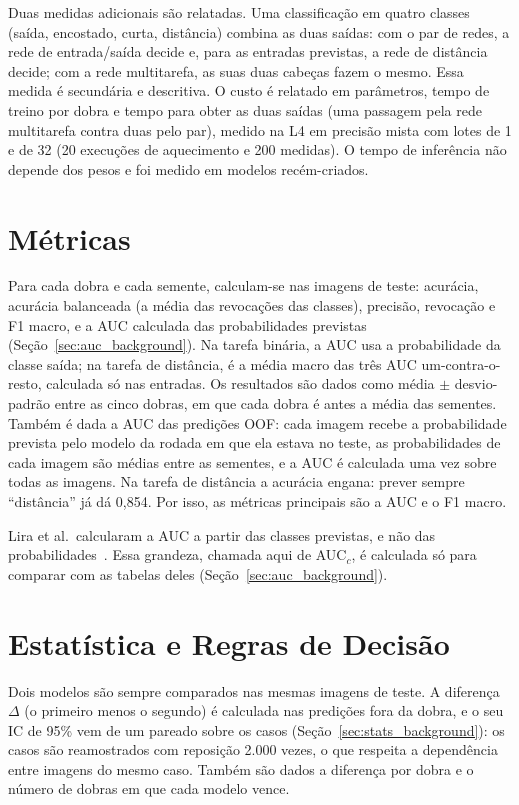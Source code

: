 Duas medidas adicionais são relatadas. Uma classificação em quatro classes (saída, encostado, curta, distância) combina as duas saídas: com o par de redes, a rede de entrada/saída decide e, para as entradas previstas, a rede de distância decide; com a rede multitarefa, as suas duas cabeças fazem o mesmo. Essa medida é secundária e descritiva. O custo é relatado em parâmetros, tempo de treino por dobra e tempo para obter as duas saídas (uma passagem pela rede multitarefa contra duas pelo par), medido na L4 em precisão mista com lotes de 1 e de 32 (20 execuções de aquecimento e 200 medidas). O tempo de inferência não depende dos pesos e foi medido em modelos recém-criados.

\section{Métricas}
\label{sec:metrics}

Para cada dobra e cada semente, calculam-se nas imagens de teste: acurácia, acurácia balanceada (a média das revocações das classes), precisão, revocação e F1 macro, e a AUC calculada das probabilidades previstas (Seção~\ref{sec:auc_background}). Na tarefa binária, a AUC usa a probabilidade da classe saída; na tarefa de distância, é a média macro das três AUC um-contra-o-resto, calculada só nas entradas. Os resultados são dados como média $\pm$ desvio-padrão entre as cinco dobras, em que cada dobra é antes a média das sementes. Também é dada a AUC das predições \gls{OOF}: cada imagem recebe a probabilidade prevista pelo modelo da rodada em que ela estava no teste, as probabilidades de cada imagem são médias entre as sementes, e a AUC é calculada uma vez sobre todas as imagens. Na tarefa de distância a acurácia engana: prever sempre ``distância'' já dá 0,854. Por isso, as métricas principais são a AUC e o F1 macro.

Lira et al.\ calcularam a AUC a partir das classes previstas, e não das probabilidades~\cite{leguwoi}. Essa grandeza, chamada aqui de AUC$_c$, é calculada só para comparar com as tabelas deles (Seção~\ref{sec:auc_background}).

\section{Estatística e Regras de Decisão}
\label{sec:stats}

Dois modelos são sempre comparados nas mesmas imagens de teste. A diferença $\Delta$ (o primeiro menos o segundo) é calculada nas predições fora da dobra, e o seu IC de 95\% vem de um  pareado sobre os casos (Seção~\ref{sec:stats_background}): os casos são reamostrados com reposição 2.000 vezes, o que respeita a dependência entre imagens do mesmo caso. Também são dados a diferença por dobra e o número de dobras em que cada modelo vence.

